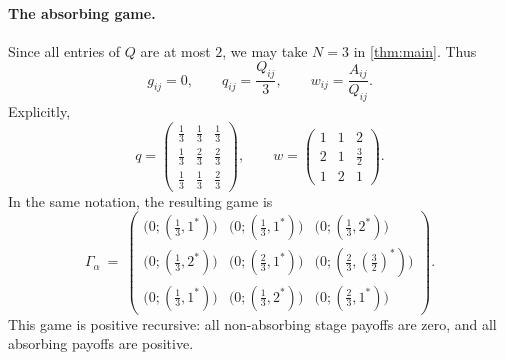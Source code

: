 \documentclass[11pt, a4paper]{article}
\theoremstyle{plain}
\theoremstyle{definition}
\begin{document}
\paragraph{The absorbing game.}
Since all entries of $Q$ are at most $2$, we may take $N=3$ in \cref{thm:main}. Thus
\[
g_{ij}=0,
\qquad
q_{ij}=\frac{Q_{ij}}3,
\qquad
w_{ij}=\frac{A_{ij}}{Q_{ij}} .
\]
Explicitly,
\[
q=
\begin{pmatrix}
\frac13&\frac13&\frac13\\[2pt]
\frac13&\frac23&\frac23\\[2pt]
\frac13&\frac13&\frac23
\end{pmatrix},
\qquad
w=
\begin{pmatrix}
1&1&2\\[2pt]
2&1&\frac32\\[2pt]
1&2&1
\end{pmatrix}.
\]
In the same notation, the resulting game is
\[
\Gamma_{\alpha}\ =\
\begin{pmatrix}
\bigl(0;(\tfrac13,1^*)\bigr) & \bigl(0;(\tfrac13,1^*)\bigr) & \bigl(0;(\tfrac13,2^*)\bigr)\\[6pt]
\bigl(0;(\tfrac13,2^*)\bigr) & \bigl(0;(\tfrac23,1^*)\bigr) & \bigl(0;(\tfrac23,(\tfrac32)^*)\bigr)\\[6pt]
\bigl(0;(\tfrac13,1^*)\bigr) & \bigl(0;(\tfrac13,2^*)\bigr) & \bigl(0;(\tfrac23,1^*)\bigr)
\end{pmatrix}.
\]
This game is positive recursive: all non-absorbing stage payoffs are zero, and all absorbing payoffs are positive.
\end{document}
